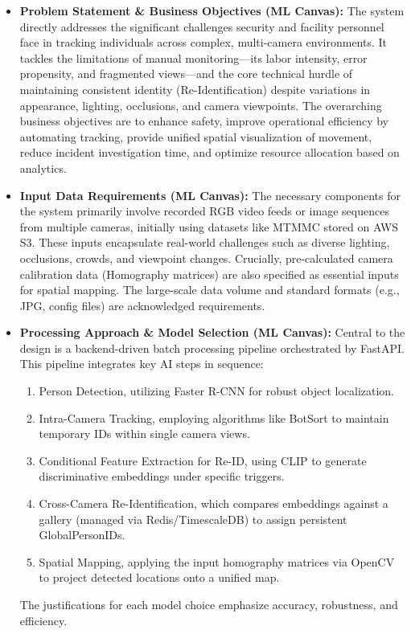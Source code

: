 \begin{itemize}
    \item \textbf{Problem Statement \& Business Objectives (ML Canvas):}
        The system directly addresses the significant challenges security and facility personnel face in tracking individuals across complex, multi-camera environments. It tackles the limitations of manual monitoring—its labor intensity, error propensity, and fragmented views—and the core technical hurdle of maintaining consistent identity (Re-Identification) despite variations in appearance, lighting, occlusions, and camera viewpoints. The overarching business objectives are to enhance safety, improve operational efficiency by automating tracking, provide unified spatial visualization of movement, reduce incident investigation time, and optimize resource allocation based on analytics.

    \item \textbf{Input Data Requirements (ML Canvas):}
        The necessary components for the system primarily involve recorded RGB video feeds or image sequences from multiple cameras, initially using datasets like MTMMC stored on AWS S3. These inputs encapsulate real-world challenges such as diverse lighting, occlusions, crowds, and viewpoint changes. Crucially, pre-calculated camera calibration data (Homography matrices) are also specified as essential inputs for spatial mapping. The large-scale data volume and standard formats (e.g., JPG, config files) are acknowledged requirements.

    \item \textbf{Processing Approach \& Model Selection (ML Canvas):}
        Central to the design is a backend-driven batch processing pipeline orchestrated by FastAPI. This pipeline integrates key AI steps in sequence:
        \begin{enumerate}[label=(\Alph*)]
            \item Person Detection, utilizing Faster R-CNN for robust object localization.
            \item Intra-Camera Tracking, employing algorithms like BotSort to maintain temporary IDs within single camera views.
            \item Conditional Feature Extraction for Re-ID, using CLIP to generate discriminative embeddings under specific triggers.
            \item Cross-Camera Re-Identification, which compares embeddings against a gallery (managed via Redis/TimescaleDB) to assign persistent GlobalPersonIDs.
            \item Spatial Mapping, applying the input homography matrices via OpenCV to project detected locations onto a unified map.
        \end{enumerate}
        The justifications for each model choice emphasize accuracy, robustness, and efficiency.


\end{itemize}
